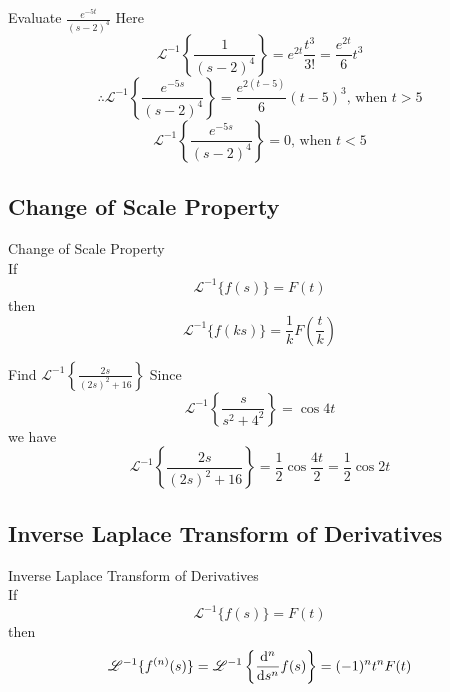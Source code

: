 \documentclass[12pt]{article}
\newcommand{\Lapinv}{\mathscr{L}^{-1}}
\begin{document}
\begin{example}{Evaluate $\displaystyle \frac{e^{-5t}}{(s-2)^4}$}{}
    Here \[
        \Lapinv \left\{ \frac{1}{(s-2)^4} \right\} = e^{2t}\frac{t^3}{3!} = \frac{e^{2t}}{6} t^3
    \] \[
        \therefore \Lapinv \left\{ \frac{e^{-5s}}{(s-2)^4} \right\} = \frac{e^{2(t-5)}}{6} (t-5)^3 \text{, when } t > 5
    \] \[
        \Lapinv \left\{ \frac{e^{-5s}}{(s-2)^4} \right\} = 0 \text{, when } t < 5
    \]
\end{example}


\subsection{Change of Scale Property}

\begin{theorem}{Change of Scale Property}{}
    \\If \[
        \Lapinv \{ f(s) \} = F(t)
    \] then \[
        \Lapinv \{ f(ks) \} = \frac{1}{k}F\left( \frac{t}{k} \right)
    \]
\end{theorem}

\begin{example}{Find $\displaystyle \Lapinv \left\{ \frac{2s}{(2s)^2+16} \right\}$}{}
    Since \[
        \Lapinv \left\{ \frac{s}{s^2+4^2} \right\} = \cos{4t}
    \] we have \[
        \Lapinv \left\{ \frac{2s}{(2s)^2+16} \right\} = \frac{1}{2} \cos{\frac{4t}{2}} = \frac{1}{2}\cos{2t}
    \]
\end{example}


\subsection{Inverse Laplace Transform of Derivatives}

\begin{theorem}{Inverse Laplace Transform of Derivatives}{}
    \\If \[
        \Lapinv \{ f(s) \} = F(t)
    \] then \[
        \Lapinv \{ f^{(n)}(s) \} = \Lapinv \left\{ \dv[n]{s} f(s) \right\} = (-1)^n t^n F(t)
    \]
\end{theorem}
\end{document}
